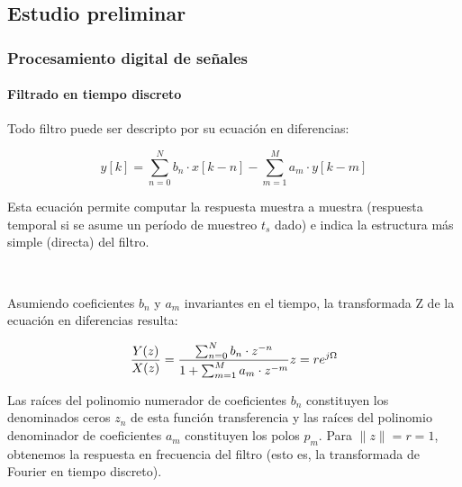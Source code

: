 \documentclass[11pt]{article}
\begin{document}
    \subsection{Estudio preliminar}\label{estudio-preliminar}

    \subsubsection{Procesamiento digital de
señales}\label{procesamiento-digital-de-seuxf1ales}

\paragraph{Filtrado en tiempo
discreto}\label{filtrado-en-tiempo-discreto}

Todo filtro puede ser descripto por su ecuación en diferencias:


\begin{equation}
y[k] = \sum^N_{n = 0} b_n \cdot x[k - n] - \sum^M_{m = 1} a_m \cdot y[k - m]
\end{equation}

Esta ecuación permite computar la respuesta muestra a muestra (respuesta
temporal si se asume un período de muestreo \(t_s\) dado) e indica la
estructura más simple (directa) del filtro.

    \begin{center}
    \end{center}
    { \hspace*{\fill} \\}
    

    Asumiendo coeficientes \(b_n\) y \(a_m\) invariantes en el tiempo, la
transformada Z de la ecuación en diferencias resulta:


\begin{equation}
\frac{Y(z)}{X(z)} = \frac{\sum^N_{n = 0} b_n \cdot z^{-n}}{1 + \sum^M_{m = 1} a_m \cdot z^{-m}} \\ 
z = re^{j\Omega}
\end{equation}

Las raíces del polinomio numerador de coeficientes \(b_n\) constituyen
los denominados ceros \(z_n\) de esta función transferencia y las raíces
del polinomio denominador de coeficientes \(a_m\) constituyen los polos
\(p_m\). Para \(\|z\| = r = 1\), obtenemos la respuesta en frecuencia
del filtro (esto es, la transformada de Fourier en tiempo discreto).
\end{document}
